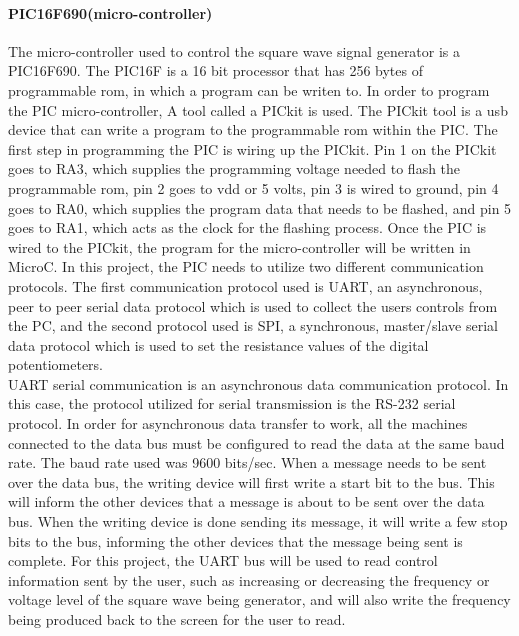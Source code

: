 \documentclass[12pt]{article}
\begin{document}
\paragraph{PIC16F690(micro-controller)}
The micro-controller used to control the square wave signal generator is a PIC16F690. The PIC16F is a 16 bit processor that has 256 bytes of programmable rom, in which a program can be writen to. In order to program the PIC micro-controller, A tool called a PICkit is used. The PICkit tool is a usb device that can write a program to the programmable rom within the PIC. The first step in programming the PIC is wiring up the PICkit. Pin 1 on the PICkit goes to RA3, which supplies the programming voltage needed to flash the programmable rom, pin 2 goes to vdd or 5 volts, pin 3 is wired to ground, pin 4 goes to RA0, which supplies the program data that needs to be flashed, and pin 5 goes to RA1, which acts as the clock for the flashing process. Once the PIC is wired to the PICkit, the program for the micro-controller will be written in MicroC. In this project, the PIC needs to utilize two different communication protocols. The first communication protocol used is UART, an asynchronous, peer to peer serial data protocol which is used to collect the users controls from the PC, and the second protocol used is SPI, a synchronous, master/slave serial data protocol which is used to set the resistance values of the digital potentiometers. \\
\indent UART serial communication is an asynchronous data communication protocol. In this case, the protocol utilized for serial transmission is the RS-232 serial protocol. In order for asynchronous data transfer to work, all the machines connected to the data bus must be configured to read the data at the same baud rate. The baud rate used was 9600 bits/sec. When a message needs to be sent over the data bus, the writing device will first write a start bit to the bus. This will inform the other devices that a message is about to be sent over the data bus. When the writing device is done sending its message, it will write a few stop bits to the bus, informing the other devices that the message being sent is complete. For this project, the UART bus will be used to read control information sent by the user, such as increasing or decreasing the frequency or voltage level of the square wave being generator, and will also write the frequency being produced back to the screen for the user to read. \\
\end{document}
